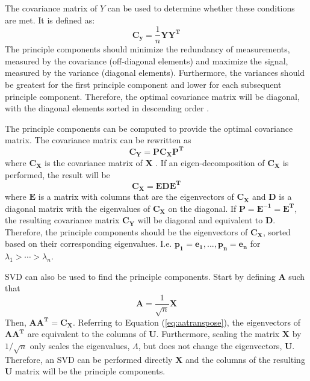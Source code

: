 \documentclass[conference]{IEEEtran}
\begin{document}
    	The covariance matrix of $Y$ can be used to determine whether these conditions are met. It is defined as:
	\begin{equation}
		\mathbf{C_y} = \frac{1}{n}{\mathbf{YY^T}}
	\end{equation} 
	The principle components should minimize the redundancy of measurements, measured by the covariance (off-diagonal elements) and maximize the signal, measured by the variance (diagonal elements). Furthermore, the variances should be greatest for the first principle component and lower for each subsequent principle component. Therefore, the optimal covariance matrix will be diagonal, with the diagonal elements sorted in descending order \cite{shlens_2014_tutorial}.
	
	The principle components can be computed to provide the optimal covariance matrix. The covariance matrix can be rewritten as
	\begin{equation}
		\mathbf{\mathbf{C_Y}} = {\mathbf{PC_XP^T}}
	\end{equation}
	where $\mathbf{C_X}$ is the covariance matrix of $\mathbf{X}$ \cite{shlens_2014_tutorial}. If an eigen-decomposition of $\mathbf{C_X}$ is performed, the result will be
	\begin{equation}
		\mathbf{C_X} = \mathbf{EDE^T}
	\end{equation}
	where $\mathbf{E}$ is a matrix with columns that are the eigenvectors of $\mathbf{C_X}$ and $\mathbf{D}$ is a diagonal matrix with the eigenvalues of $\mathbf{C_X}$ on the diagonal. If $\mathbf{P} = \mathbf{E^{-1}} = \mathbf{E^T}$, the resulting covariance matrix $\mathbf{C_Y}$ will be diagonal and equivalent to $\mathbf{D}$. Therefore, the principle components should be the eigenvectors of $\mathbf{C_X}$, sorted based on their corresponding eigenvalues. I.e. \newline $\mathbf{p_1} = \mathbf{e_1}, ..., \mathbf{p_n} = \mathbf{e_n}$ for $\lambda_1 > \cdots > \lambda_n$. 
	
	SVD can also be used to find the principle components. Start by defining $\mathbf{A}$ such that
	\begin{equation*}
		\mathbf{A} = \frac{1}{\sqrt{n}}\mathbf{X}
	\end{equation*}
	Then, $\mathbf{AA^T} = \mathbf{C_X}$. Referring to Equation (\ref{eq:aatranspose}), the eigenvectors of $\mathbf{AA^T}$ are equivalent to the columns of $\mathbf{U}$. Furthermore, scaling the matrix $\mathbf{X}$ by $1/\sqrt{n}$ only scales the eigenvalues, $\Lambda$, but does not change the eigenvectors, $\mathbf{U}$. Therefore, an SVD can be performed directly $\mathbf{X}$ and the columns of the resulting $\mathbf{U}$ matrix will be the principle components.
    
\end{document}
